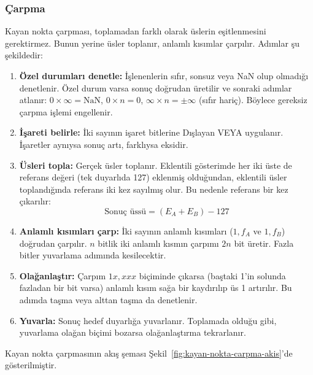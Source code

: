 \subsubsection{Çarpma}

Kayan nokta çarpması, toplamadan farklı olarak üslerin eşitlenmesini gerektirmez. Bunun yerine üsler toplanır, anlamlı kısımlar çarpılır. Adımlar şu şekildedir:

\begin{enumerate}
\item \textbf{Özel durumları denetle:} İşlenenlerin sıfır, sonsuz veya NaN olup olmadığı denetlenir. Özel durum varsa sonuç doğrudan üretilir ve sonraki adımlar atlanır: $0 \times \infty = \text{NaN}$, $0 \times n = 0$, $\infty \times n = \pm\infty$ (sıfır hariç). Böylece gereksiz çarpma işlemi engellenir.

\item \textbf{İşareti belirle:} İki sayının işaret bitlerine Dışlayan VEYA uygulanır. İşaretler aynıysa sonuç artı, farklıysa eksidir.

\item \textbf{Üsleri topla:} Gerçek üsler toplanır. Eklentili gösterimde her iki üste de referans değeri (tek duyarlıda 127) eklenmiş olduğundan, eklentili üsler toplandığında referans iki kez sayılmış olur. Bu nedenle referans bir kez çıkarılır:
\[
\text{Sonuç üssü} = (E_A + E_B) - 127
\]

\item \textbf{Anlamlı kısımları çarp:} İki sayının anlamlı kısımları ($1{,}f_A$ ve $1{,}f_B$) doğrudan çarpılır. $n$ bitlik iki anlamlı kısmın çarpımı $2n$ bit üretir. Fazla bitler yuvarlama adımında kesilecektir.

\item \textbf{Olağanlaştır:} Çarpım $1x{,}xxx$ biçiminde çıkarsa (baştaki 1'in solunda fazladan bir bit varsa) anlamlı kısım sağa bir kaydırılıp üs 1 artırılır. Bu adımda taşma veya alttan taşma da denetlenir.

\item \textbf{Yuvarla:} Sonuç hedef duyarlığa yuvarlanır. Toplamada olduğu gibi, yuvarlama olağan biçimi bozarsa olağanlaştırma tekrarlanır.
\end{enumerate}

Kayan nokta çarpmasının akış şeması Şekil~\ref{fig:kayan-nokta-carpma-akis}'de gösterilmiştir.

